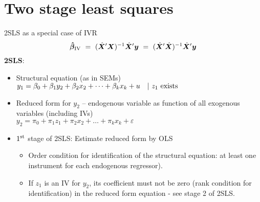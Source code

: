 \documentclass[usenames,dvipsnames]{beamer}
\begin{document}
\section{Two stage least squares}
\begin{frame}{2SLS as a special case of IVR}
$$
 \bm{\hat{\beta}}_{\textnormal{IV}} ~=~ 
 (\hat{\bm{X}}^{\prime}\bm{X})^{-1} \hat{\bm{X}}^{\prime}\bm{y} 
 ~=~ (\hat{\bm{X}}^{\prime}\hat{\bm{X}})^{-1} \hat{\bm{X}}^{\prime}\bm{y}
$$
\textbf{2SLS}: 
\begin{itemize}
\item Structural equation (as in SEMs) \\
\smallskip
$y_1=\beta_0+\beta_1 y_2+\beta_2 x_2+ \dots + \beta_k x_{k} +u \quad | ~z_1 \textnormal{~exists}$\\
\medskip
\item Reduced form for $y_2$ – endogenous variable as function of all exogenous variables (including IVs) \\
\smallskip
$y_2=\pi_0+\pi_1 z_1 + \pi_{2} x_{2} + \dots +\pi_k x_k + \varepsilon$
\medskip
\item $1^{\textnormal{st}}$ stage of 2SLS: Estimate reduced form by OLS
\smallskip
\begin{itemize}
    \item Order condition for identification of the structural equation: at least one instrument for each endogenous regressor).
    \smallskip
    \item If $z_1$ is an IV for $y_2$, its coefficient must not be zero (rank condition for identification) in the reduced form equation - see stage 2 of 2SLS.
\end{itemize}
\end{itemize}
\end{frame}
\end{document}
